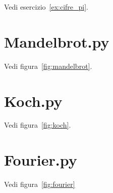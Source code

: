 Vedi esercizio~\ref{ex:cifre_pi}.
\label{code:compute_pi}


\section{Mandelbrot.py}

Vedi figura~\ref{fig:mandelbrot}.
\label{code:Mandelbrot}


\section{Koch.py}

Vedi figura~\ref{fig:koch}.
\label{code:Koch}


\section{Fourier.py}

Vedi figura~\ref{fig:fourier}
\label{code:Fourier}

